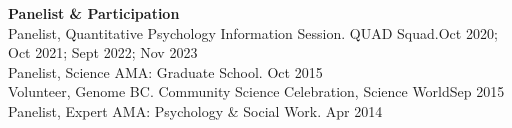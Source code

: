 {\large \textbf{Panelist \& Participation}}\\
Panelist, Quantitative Psychology Information Session. QUAD Squad.\hfill{Oct 2020; Oct 2021;}\newline 
\hspace*{0pt}\hfill{Sept 2022; Nov 2023}\smallskip\\
Panelist, Science AMA: Graduate School. \hfill{Oct 2015}\smallskip\\
Volunteer, Genome BC. Community Science Celebration, Science World\hfill{Sep 2015}\smallskip\\
Panelist, Expert AMA: Psychology \& Social Work. \hfill{Apr 2014}%
